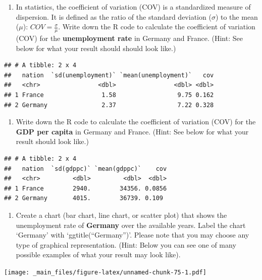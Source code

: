 \documentclass[
  12pt,
  oneside]{book}
\providecommand{\tightlist}{%
  \setlength{\itemsep}{0pt}\setlength{\parskip}{0pt}}
\theoremstyle{definition}
\theoremstyle{definition}
\theoremstyle{definition}
\theoremstyle{definition}
\theoremstyle{remark}
\begin{document}
\begin{enumerate}
\def\labelenumi{(\arabic{enumi})}
\setcounter{enumi}{18}
\tightlist
\item
  In statistics, the coefficient of variation (COV) is a standardized measure of
  dispersion. It is defined as the ratio of the standard deviation (\(\sigma\)) to the mean (\(\mu\)):
  \(COV={\frac {\sigma }{\mu }}\).
  Write down the R code to calculate the coefficient of variation (COV) for the
  \textbf{unemployment rate} in Germany and France. (Hint: See below for what your result should should look like.)
\end{enumerate}

\begin{verbatim}
## # A tibble: 2 x 4
##   nation  `sd(unemployment)` `mean(unemployment)`   cov
##   <chr>                <dbl>                <dbl> <dbl>
## 1 France                1.58                 9.75 0.162
## 2 Germany               2.37                 7.22 0.328
\end{verbatim}

\begin{enumerate}
\def\labelenumi{(\arabic{enumi})}
\setcounter{enumi}{19}
\tightlist
\item
  Write down the R code to calculate the coefficient of variation (COV) for the \textbf{GDP per capita}
  in Germany and France. (Hint: See below for what your result should look like.)
\end{enumerate}

\begin{verbatim}
## # A tibble: 2 x 4
##   nation  `sd(gdppc)` `mean(gdppc)`    cov
##   <chr>         <dbl>         <dbl>  <dbl>
## 1 France        2940.        34356. 0.0856
## 2 Germany       4015.        36739. 0.109
\end{verbatim}

\begin{enumerate}
\def\labelenumi{(\arabic{enumi})}
\setcounter{enumi}{20}
\tightlist
\item
  Create a chart (bar chart, line chart, or scatter plot) that shows the
  unemployment rate of \textbf{Germany} over the available years. Label the chart
  `Germany' with `ggtitle(``Germany'')'. Please note that you may choose any type of graphical representation.
  (Hint: Below you can see one of many possible examples of what your result may look like).
\end{enumerate}

\texttt{[image: \_main\_files/figure-latex/unnamed-chunk-75-1.pdf]}
\end{document}
